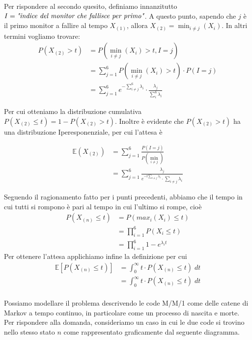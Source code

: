 \documentclass{homework}
\begin{document}
Per rispondere al secondo quesito, definiamo innanzitutto $I = \emph{"indice del monitor che fallisce per primo"}$. A questo punto, sapendo che $j$ è il primo monitor a fallire al tempo $X_{(1)}$, allora $X_{(2)} =\min_{i \neq j}(X_i)$. In altri termini vogliamo trovare:
\begin{align*}
P(X_{(2)} > t) &= P(\min_{i \neq j}(X_i) > t, I = j) \\
               &= \sum_{j=1}^6 P(\min_{i \neq j}(X_i) > t) \cdot P(I = j)\\
               &= \sum_{j=1}^6 e^{-\sum_{i \neq j}^6 \lambda_i} \cdot \frac{\lambda_j}{\sum_i^6 \lambda_i}
\end{align*}

Per cui otteniamo la distribuzione cumulativa $P(X_{(2)} \leq t ) =  1 - P(X_{(2)} > t)$.
Inoltre è evidente che $P(X_{(2)} > t)$ ha una distribuzione Iperesponenziale, per cui l'attesa è

\begin{align*}
\mathbb{E}(X_{(2)}) &= \sum_{j=1}^6 \frac{P(I=j)}{P(\min_{i \neq j})}\\
                    &= \sum_{j=1}^6 \frac{\lambda_j}{e^{-t \sum_{i \neq j} \lambda_i}\cdot \sum_{i \neq j} \lambda_i}
\end{align*}


\exercise*[3.b]
Seguendo il ragionamento fatto per i punti precedenti, abbiamo che il tempo in cui tutti si rompono è pari al tempo in cui l'ultimo si rompe, cioè
\begin{align*}
P(X_{(n)} \leq t) &= P(max_i(X_i) \leq t)\\
                  &= \prod_{i=1}^6 P(X_i \leq t)\\
                  &= \prod_{i=1}^6 1 - e^{\lambda_i t}
\end{align*}
Per ottenere l'attesa applichiamo infine la definizione per cui
\begin{align*}
\mathbb{E}[P(X_{(n)} \leq t)] &= \int_0^{\infty} t \cdot P(X_{(n)} \leq t)\;dt\\
                              &= \int_0^{\infty} t \cdot P(X_{(n)} \leq t)\;dt\\
\end{align*}


\exercise*[4.a]
Possiamo modellare il problema descrivendo le code M/M/1 come delle catene di Markov a tempo continuo, in particolare come un processo di nascita e morte. 
Per rispondere alla domanda, consideriamo un caso in cui le due code si trovino nello stesso stato $n$ come rappresentato graficamente dal seguente diagramma.
\end{document}

